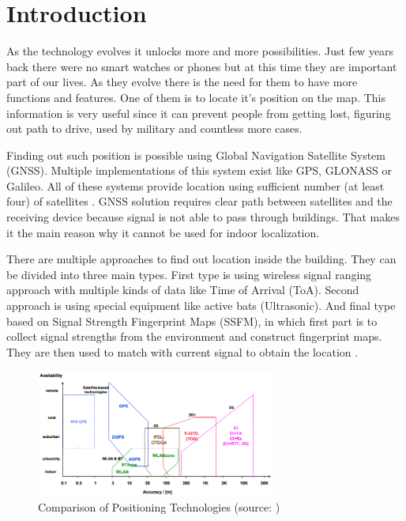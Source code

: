 \chapter{Introduction}\label{sec:Introduction}
\setcounter{page}{1}
As the technology evolves it unlocks more and more possibilities. Just few years back there were no smart watches or phones but at this time they are important part of our lives. As they evolve there is the need for them to have more functions and features. One of them is to locate it's position on the map. This information is very useful since it can prevent people from getting lost, figuring out path to drive, used by military and countless more cases.

Finding out such position is possible using Global Navigation Satellite System (GNSS). Multiple implementations of this system exist like GPS, GLONASS or Galileo. All of these systems provide location using sufficient number (at least four) of satellites \cite{GNSS, GNSSGPS}. GNSS solution requires clear path between satellites and the receiving device because signal is not able to pass through buildings. That makes it the main reason why it cannot be used for indoor localization.

There are multiple approaches to find out location inside the building. They can be divided into three main types. First type is using wireless signal ranging approach with multiple kinds of data like Time of Arrival (ToA). Second approach is using special equipment like active bats (Ultrasonic). And final type based on Signal Strength Fingerprint Maps (SSFM), in which first part is to collect signal strengths from the environment and construct fingerprint maps. They are then used to match with current signal to obtain the location \cite{LocalizationApproaches}.

\begin{figure}[h!]
	\begin{centering}
		\includegraphics[width=0.7\textwidth]{img/1_comparison_of_positionin_technologies}
		\par\end{centering}
	\caption{Comparison of Positioning Technologies (source: \cite{PedestrianDeadReckoning})\label{fig:1_comparison_of_positionin_technologies}}
\end{figure}

